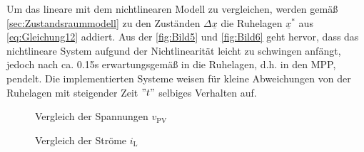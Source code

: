 Um das lineare mit dem nichtlinearen Modell zu vergleichen, werden gemäß \autoref{sec:Zustandsraummodell} zu den Zuständen $\Delta \underline{x}$ die Ruhelagen $\underline{x}^*$ aus \autoref{eq:Gleichung12} addiert. Aus der \autoref{fig:Bild5} und \autoref{fig:Bild6} geht hervor, dass das nichtlineare System aufgund der Nichtlinearität leicht zu schwingen anfängt, jedoch nach ca. 0.15s erwartungsgemäß in die Ruhelagen, d.h. in den MPP, pendelt. Die implementierten Systeme weisen für kleine Abweichungen von der Ruhelagen mit steigender Zeit $"t"$ selbiges Verhalten auf.

\begin{figure}[H]
   \centering
   \caption[Vergleich der Spannungen $v_{\mathrm{PV}}$]{Vergleich der Spannungen $v_{\mathrm{PV}}$}
   \label{fig:Bild5}
\end{figure}

\begin{figure}[H]
   \centering
   \caption[Vergleich der Ströme $i_{\mathrm{L}}$]{Vergleich der Ströme $i_{\mathrm{L}}$}
   \label{fig:Bild6}
\end{figure}
